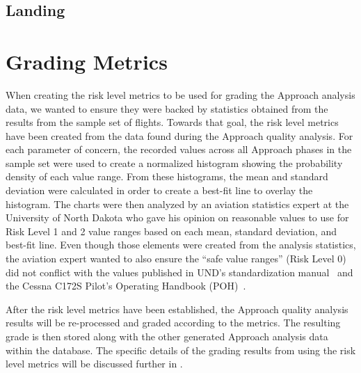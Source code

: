     
    \subsection{Landing}
    
    

\section{Grading Metrics}
    
    When creating the risk level metrics to be used for grading the Approach analysis data, we wanted to ensure they were backed by statistics obtained from the results from the sample set of flights.  Towards that goal, the risk level metrics have been created from the data found during the Approach quality analysis.  For each parameter of concern, the recorded values across all Approach phases in the sample set were used to create a normalized histogram showing the probability density of each value range.  From these histograms, the mean and standard deviation were calculated in order to create a best-fit line to overlay the histogram.  The charts were then analyzed by an aviation statistics expert at the University of North Dakota who gave his opinion on reasonable values to use for Risk Level 1 and 2 value ranges based on each mean, standard deviation, and best-fit line.  Even though those elements were created from the analysis statistics, the aviation expert wanted to also ensure the ``safe value ranges'' (Risk Level 0) did not conflict with the values published in UND's standardization manual~\cite{und_flight_manual} and the Cessna C172S Pilot's Operating Handbook (POH)~\cite{und_poh}.
    
    After the risk level metrics have been established, the Approach quality analysis results will be re-processed and graded according to the metrics.  The resulting grade is then stored along with the other generated Approach analysis data within the database.  The specific details of the grading results from using the risk level metrics will be discussed further in .
    
    
